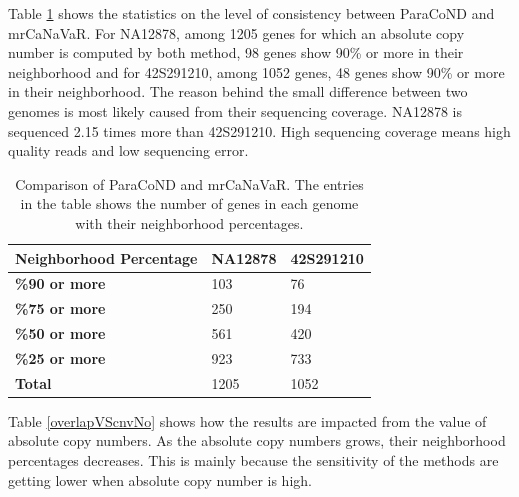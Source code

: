 Table \ref{overlapTable} shows the statistics on the level of consistency between ParaCoND and mrCaNaVaR. 
For NA12878, among 1205 genes for which an absolute copy number is computed by both method, 98 genes show 90\% or more in their neighborhood and for 42S291210, among 1052 genes, 48 genes show 90\% or more in their neighborhood. The reason behind the small difference between two genomes is most likely caused from their sequencing coverage. NA12878 is sequenced 2.15 times more than 42S291210. High sequencing coverage means high quality reads and low sequencing error. 

\begin{table}[!htbp]
    \centering
    \begin{tabular}{lll}
    \hline
    \textbf{Neighborhood Percentage}             & \textbf{NA12878} & \textbf{42S291210}   \\ \hline
    \textbf{\%90 or more} & 103      & 76   \\
    \textbf{\%75 or more} & 250     & 194  \\
    \textbf{\%50 or more} & 561     & 420  \\
    \textbf{\%25 or more} & 923      & 733   \\ \hline
    \textbf{Total}        & 1205    & 1052 \\ \hline
    \end{tabular}
    \caption{Comparison of ParaCoND and mrCaNaVaR. The entries in the table shows the number of genes in each genome with their neighborhood percentages.}
    \label{overlapTable}
\end{table}

Table \ref{overlapVScnvNo} shows how the results are impacted from the value of absolute copy numbers. As the absolute copy numbers grows, their neighborhood percentages decreases. This is mainly because the sensitivity of the methods are getting lower when absolute copy number is high.

